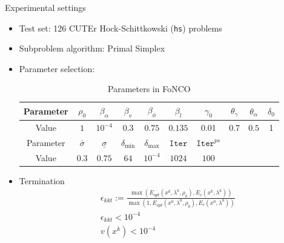 \documentclass[8pt]{beamer}
\begin{document}
 
  
\begin{frame}{Experimental settings}

\begin{itemize}
\item Test set:  126 CUTEr Hock-Schittkowski (\texttt{hs}) problems
\vfill
\item Subproblem algorithm: Primal Simplex
\vfill
\item Parameter selection:   
\begin{table}[H]
\centering
\caption{Parameters in FoNCO}
\label{tab.para}
\begin{tabular}{c|ccccccccc}\hline
 Parameter  & $\rho_0$   &  $\beta_\alpha$  &  $\beta_v$& $\beta_\phi$ & $\beta_l$                  &  $\gamma_0$  &  $\theta_\gamma$   & $\theta_\alpha$    & $\delta_0$    \\ \hline 
 Value   &   $1$    &  $10^{-4}     $  &  $0.3    $& $0.75$       & $0.135$ &     0.01     &  0.7   &   $0.5$  & 1  \\  \hline\hline

Parameter &      $\bar\sigma$     &  $\underline{\sigma}$  &  $\delta_{\min} $  &    $\delta_{\max}$      & $\texttt{Iter}$ & $\texttt{Iter}^{ps}$  &  & & \\  \hline
 Value &           $0.3$  &   $0.75$  &  $64$       &   $10^{-4}$  &        $1024$   &  $100$ & & & \\  \hline
\end{tabular}
\end{table}
\item Termination 
\begin{equation}\label{relative.kkt}
\begin{aligned}
  & \epsilon_{kkt} := \frac{\max(E_{opt}(x^k, \lambda^k, \rho_k), E_c(x^k, \lambda^k))}{\max(1, E_{opt}(x^0, \lambda^0, \rho_0), E_c(x^0, \lambda^0))}\\
  & \epsilon_{kkt} < 10^{-4} \\
  & v(x^k) < 10^{-4}
\end{aligned}\end{equation}

\end{itemize}

\end{frame}
\end{document}
